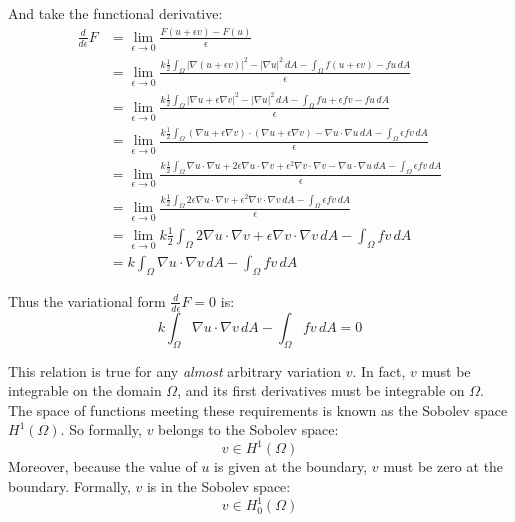 \documentclass[a4paper]{report}
\begin{document}
And take the functional derivative:
\begin{align}
\frac{d}{d\epsilon}F & = \lim_{\epsilon \rightarrow 0}
                         \frac{F(u + \epsilon v) - F(u)}{\epsilon} \\
  & = \lim_{\epsilon \rightarrow 0}
    \frac{k \frac{1}{2} \int_{\Omega} |\nabla (u + \epsilon v)|^2 - |\nabla u|^2 \,dA
        - \int_{\Omega} f (u + \epsilon v) - f u \,dA}
         {\epsilon} \\
  & = \lim_{\epsilon \rightarrow 0}
    \frac{k \frac{1}{2} \int_{\Omega} |\nabla u + \epsilon \nabla v|^2 - |\nabla u|^2 \,dA
        - \int_{\Omega} f u + \epsilon f v - f u \,dA}
         {\epsilon} \\
  & = \lim_{\epsilon \rightarrow 0}
    \frac{k \frac{1}{2} \int_{\Omega} (\nabla u +  \epsilon \nabla v) \cdot 
    (\nabla u +  \epsilon \nabla v) - \nabla u \cdot \nabla u \,dA
        - \int_{\Omega} \epsilon f v \,dA}
         {\epsilon} \\       
  & = \lim_{\epsilon \rightarrow 0}
    \frac{k \frac{1}{2} \int_{\Omega} \nabla u \cdot \nabla u + 2 \epsilon \nabla u \cdot 
    \nabla v + \epsilon^2 \nabla v \cdot \nabla v - \nabla u \cdot \nabla u \,dA
        - \int_{\Omega} \epsilon f v \,dA}
         {\epsilon} \\                    
  & = \lim_{\epsilon \rightarrow 0}
    \frac{k \frac{1}{2} \int_{\Omega} 2 \epsilon \nabla u \cdot \nabla v
     + \epsilon^2 \nabla v \cdot \nabla v \,dA
        - \int_{\Omega} \epsilon f v \,dA}
         {\epsilon} \\
  & = \lim_{\epsilon \rightarrow 0}
    k \frac{1}{2} \int_{\Omega} 2 \nabla u \cdot \nabla v
     + \epsilon \nabla v \cdot \nabla v \,dA
        - \int_{\Omega} f v \,dA\\     
  & =
    k \int_{\Omega} \nabla u \cdot \nabla v \,dA
        - \int_{\Omega} f v \,dA
\end{align}

Thus the variational form $\frac{d}{d\epsilon}F = 0$ is:
\begin{equation}
k \int_{\Omega} \nabla u \cdot \nabla v \,dA
        - \int_{\Omega} f v \,dA = 0
\end{equation}

This relation is true for any \emph{almost} arbitrary variation $v$.  In fact, $v$ must be integrable on the domain $\Omega$, and its first derivatives must be integrable on $\Omega$.
The space of functions meeting these requirements is known as the Sobolev space $H^1(\Omega) $.  So formally, $v$ belongs to the Sobolev space:
\begin{equation}
v \in H^1 (\Omega)
\end{equation}
Moreover, because the value of $u$ is given at the boundary, $v$ must be zero at the boundary.  Formally, $v$ is in the Sobolev space:
\begin{equation}
v \in H_0^1 (\Omega)
\end{equation}
\end{document}
